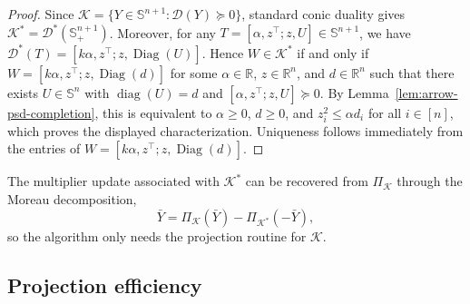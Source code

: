 \documentclass[11pt]{article}
\DeclareMathOperator{\diag}{diag}
\DeclareMathOperator{\Diag}{Diag}
\def\D{\mathcal{D}}
\def\K{\mathcal{K}}
\def\R{\mathbb{R}}
\def\S{\mathbb{S}}
\theoremstyle{plain}
\begin{document}
\begin{proof}\;
Since $\K=\{Y\in\S^{n+1}:\D(Y)\succeq 0\}$, standard conic duality gives
$\K^*=\D^*(\S^{n+1}_+)$. Moreover, for any $T=[\alpha, z^\top; z, U]\in \S^{n+1}$, we have
$\D^*(T)=[k\alpha, z^\top; z, \Diag(U)]$. Hence $W\in\K^*$ if and only if
$W=[k\alpha, z^\top; z, \Diag(d)]$
for some $\alpha\in\R$, $z\in\R^n$, and $d\in\R^n$ such that there exists
$U\in\S^n$ with $\diag(U)=d$ and $[\alpha, z^\top; z, U]\succeq 0$. By Lemma~\ref{lem:arrow-psd-completion}, this is equivalent to
$\alpha\ge 0$, $d\ge 0$, and $z_i^2\le \alpha d_i$ for all $i\in[n]$, which proves the displayed characterization. Uniqueness follows immediately from the entries of $W=[k\alpha, z^\top; z, \Diag(d)]$.
\end{proof}


The multiplier update associated with $\K^*$ can be recovered from $\Pi_\K$ through the Moreau decomposition,
\begin{equation}\label{rem:moreau}
    \bar Y=\Pi_\K(\bar Y)-\Pi_{\K^*}(-\bar Y),
\end{equation}
so the algorithm only needs the projection routine for $\K$.


\subsection{Projection efficiency}\label{subsec:projection-efficiency}
\end{document}
